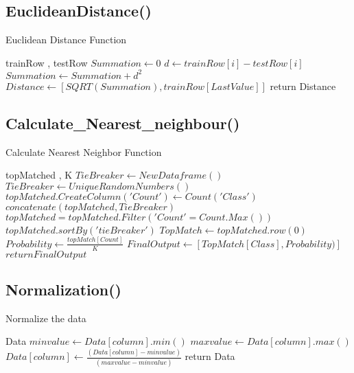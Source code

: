 \documentclass{article}
\begin{document}
 \subsection{EuclideanDistance()}
\begin{algorithm}[H]
\caption{Euclidean Distance Function}
\begin{algorithmic}[1]
\REQUIRE trainRow , testRow 
\STATE $ Summation \gets 0	 $
        \STATE $d \gets trainRow[i] - testRow[i]$
        \STATE $Summation \gets Summation + d^{2}$
  	\ENDFOR
\STATE $Distance \gets [SQRT(Summation) , trainRow[LastValue] ]$  
\STATE return Distance

\end{algorithmic}
\end{algorithm}


 \subsection{Calculate\_Nearest\_neighbour()}
 
\begin{algorithm}[H]
\caption{Calculate Nearest Neighbor Function}
\begin{algorithmic}[1]
\REQUIRE topMatched , K 
	\STATE $TieBreaker \gets NewDataframe()$
	\STATE $TieBreaker \gets UniqueRandomNumbers()$
	\STATE $topMatched.CreateColumn('Count') \gets Count('Class')$
	\STATE $concatenate(topMatched, TieBreaker)$
	\STATE $topMatched = topMatched.Filter( 'Count' = Count.Max())$
	\STATE $topMatched.sortBy('tieBreaker')$
	\STATE $TopMatch \gets topMatched.row(0) $ 
	\STATE $Probability \gets \frac{topMatch[Count]}{ K}$
	\STATE $ FinalOutput \gets [TopMatch[Class], Probability)] $ 
    \STATE $return FinalOutput$
       
\end{algorithmic}
\end{algorithm}

 \subsection{Normalization()}
\begin{algorithm}[H]
\caption{Normalize the data}
\begin{algorithmic}[1]
\REQUIRE Data
    	\STATE $ minvalue \gets Data[column].min()$
    	\STATE $ maxvalue \gets Data[column].max()$
    	\STATE $ Data[column] \gets  \frac{(Data[column] - minvalue) }{ (maxvalue - minvalue)} $
	\ENDFOR  
	\STATE  return Data
\end{algorithmic}
\end{algorithm}
\end{document}
